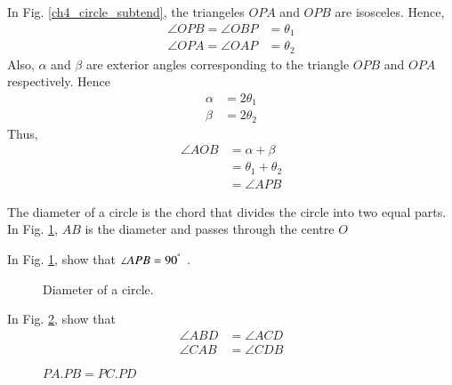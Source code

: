 \proof In Fig. \ref{ch4_circle_subtend}, the triangeles $OPA$ and $OPB$ are isosceles. Hence,
%
\begin{align}
\angle OPB = \angle OBP &= \theta_1 \\
\angle OPA = \angle OAP &= \theta_2
\end{align}
%
Also, $\alpha$ and $\beta$ are exterior angles corresponding to the triangle $OPB$ and $OPA$ respectively. Hence
%
\begin{align}
\alpha &= 2\theta_1 \\
\beta &= 2\theta_2
\end{align}
%
Thus,
%
\begin{align}
\angle AOB &= \alpha + \beta \\
&= \theta_1 + \theta_2 \\
&= \angle APB
\end{align}
%
\begin{definition}
	The diameter of a circle is the chord that divides the circle into two equal parts. In Fig. \ref{ch4_circle_dia}, $AB$ is the diameter and passes through the centre $O$
\end{definition}
%
\begin{problem}
In Fig. \ref{ch4_circle_dia}, show that $\angle APB = 90^{\degree}$ .
\end{problem}
%
\begin{figure}[!h]
	\begin{center}
		
		\resizebox{\columnwidth}{!}{}
	\end{center}
	\caption{Diameter of a circle.}
	\label{ch4_circle_dia}	
\end{figure}
\begin{problem}
	In Fig. \ref{ch4_chord_product}, show that 
	\begin{equation}
	\begin{split}
\angle ABD &= \angle ACD \\
\angle CAB &= \angle CDB	
	\end{split}
	\end{equation}
\end{problem}
\begin{figure}[!h]
	\begin{center}
		
		\resizebox{\columnwidth}{!}{}
	\end{center}
	\caption{$PA.PB = PC.PD$}
	\label{ch4_chord_product}	
\end{figure}
